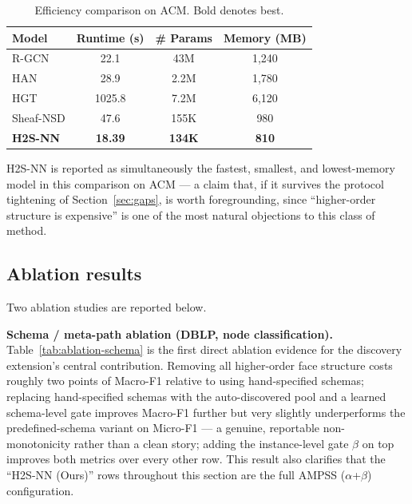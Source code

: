 \documentclass{article}
\begin{document}
\begin{table}[h]
  \centering
  \caption{Efficiency comparison on ACM. Bold denotes best.}
  \label{tab:efficiency}
  \small
  \begin{tabular}{lccc}
    \toprule
    \textbf{Model} & Runtime (s) & \# Params & Memory (MB) \\
    \midrule
    R-GCN & 22.1 & 43M & 1{,}240 \\
    HAN & 28.9 & 2.2M & 1{,}780 \\
    HGT & 1025.8 & 7.2M & 6{,}120 \\
    Sheaf-NSD & 47.6 & 155K & 980 \\
    \midrule
    \textbf{H2S-NN} & \textbf{18.39} & \textbf{134K} & \textbf{810} \\
    \bottomrule
  \end{tabular}
\end{table}

H2S-NN is reported as simultaneously the fastest, smallest, and lowest-memory model in this
comparison on ACM --- a claim that, if it survives the protocol tightening of
Section~\ref{sec:gaps}, is worth foregrounding, since ``higher-order structure is expensive'' is
one of the most natural objections to this class of method.

\subsection{Ablation results}
\label{sec:ablation-schema}

Two ablation studies are reported below.

\textbf{Schema / meta-path ablation (DBLP, node classification).} Table~\ref{tab:ablation-schema}
is the first direct ablation evidence for the discovery extension's central contribution.
Removing all higher-order face structure costs roughly two points of Macro-F1 relative to using
hand-specified schemas; replacing hand-specified schemas with the auto-discovered pool and a
learned schema-level gate improves Macro-F1 further but very slightly underperforms the
predefined-schema variant on Micro-F1 --- a genuine, reportable non-monotonicity rather than a
clean story; adding the instance-level gate $\beta$ on top improves both metrics over every other
row. This result also clarifies that the ``H2S-NN (Ours)'' rows throughout this section are the
full AMPSS ($\alpha$+$\beta$) configuration.
\end{document}
